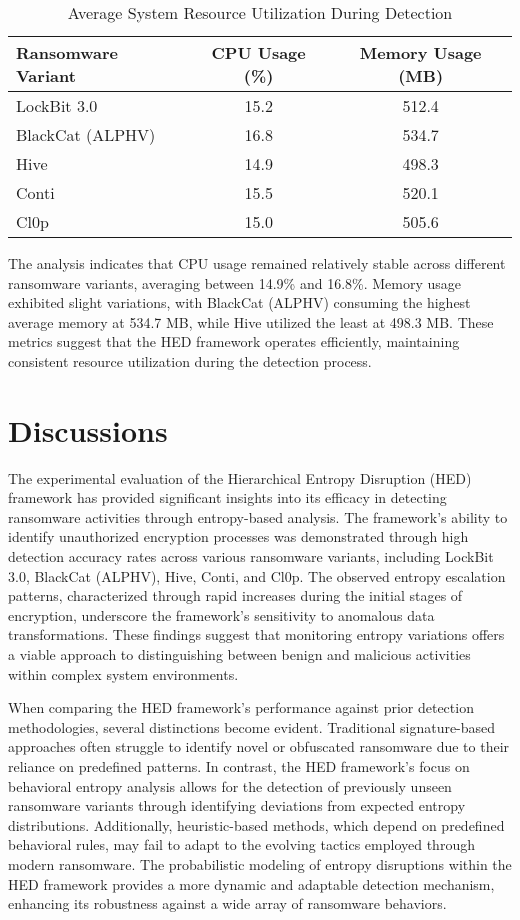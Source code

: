 \documentclass[lettersize,journal]{IEEEtran}
\begin{document}
\begin{table}[h]
	\centering
	\caption{Average System Resource Utilization During Detection}
	\label{tab:resource_utilization}
	\begin{tabular}{|l|c|c|}
		\hline
		\textbf{Ransomware Variant} & \textbf{CPU Usage (\%)} & \textbf{Memory Usage (MB)} \\
		\hline
		LockBit 3.0 & 15.2 & 512.4 \\
		BlackCat (ALPHV) & 16.8 & 534.7 \\
		Hive & 14.9 & 498.3 \\
		Conti & 15.5 & 520.1 \\
		Cl0p & 15.0 & 505.6 \\
		\hline
	\end{tabular}
\end{table}

The analysis indicates that CPU usage remained relatively stable across different ransomware variants, averaging between 14.9\% and 16.8\%. Memory usage exhibited slight variations, with BlackCat (ALPHV) consuming the highest average memory at 534.7 MB, while Hive utilized the least at 498.3 MB. These metrics suggest that the HED framework operates efficiently, maintaining consistent resource utilization during the detection process.


\section{Discussions}

The experimental evaluation of the Hierarchical Entropy Disruption (HED) framework has provided significant insights into its efficacy in detecting ransomware activities through entropy-based analysis. The framework's ability to identify unauthorized encryption processes was demonstrated through high detection accuracy rates across various ransomware variants, including LockBit 3.0, BlackCat (ALPHV), Hive, Conti, and Cl0p. The observed entropy escalation patterns, characterized through rapid increases during the initial stages of encryption, underscore the framework's sensitivity to anomalous data transformations. These findings suggest that monitoring entropy variations offers a viable approach to distinguishing between benign and malicious activities within complex system environments.

When comparing the HED framework's performance against prior detection methodologies, several distinctions become evident. Traditional signature-based approaches often struggle to identify novel or obfuscated ransomware due to their reliance on predefined patterns. In contrast, the HED framework's focus on behavioral entropy analysis allows for the detection of previously unseen ransomware variants through identifying deviations from expected entropy distributions. Additionally, heuristic-based methods, which depend on predefined behavioral rules, may fail to adapt to the evolving tactics employed through modern ransomware. The probabilistic modeling of entropy disruptions within the HED framework provides a more dynamic and adaptable detection mechanism, enhancing its robustness against a wide array of ransomware behaviors.
\end{document}
